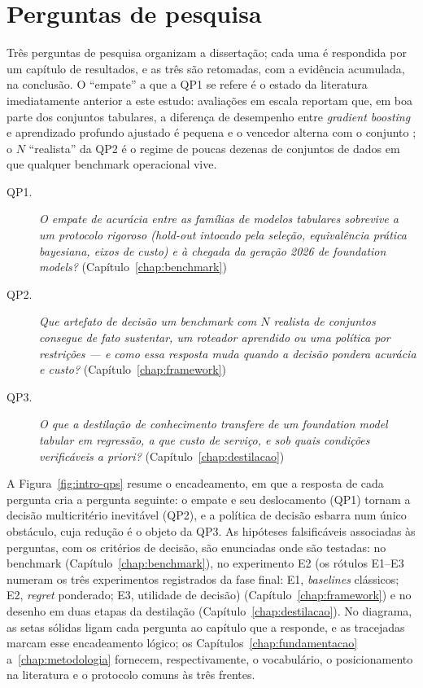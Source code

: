 \section{Perguntas de pesquisa}
\label{sec:intro-qps}

Três perguntas de pesquisa organizam a dissertação; cada uma é respondida
por um capítulo de resultados, e as três são retomadas, com a evidência
acumulada, na conclusão. O ``empate'' a que a QP1 se refere é o estado
da literatura imediatamente anterior a este estudo: avaliações em
escala reportam que, em boa parte dos conjuntos tabulares, a diferença
de desempenho entre \emph{gradient boosting} e aprendizado profundo
ajustado é pequena e o vencedor alterna com o conjunto
\citep{mcelfresh2023}; o $N$ ``realista'' da QP2 é o regime de
poucas dezenas de conjuntos de dados em que qualquer benchmark
operacional vive.

\begin{description}
  \item[QP1.] \emph{O empate de acurácia entre as famílias de modelos
    tabulares sobrevive a um protocolo rigoroso (\emph{hold-out}
    intocado pela seleção,
    equivalência prática bayesiana, eixos de custo) e à chegada da
    geração 2026 de foundation models?}
    (Capítulo~\ref{chap:benchmark})
  \item[QP2.] \emph{Que artefato de decisão um benchmark com $N$ realista
    de conjuntos consegue de fato sustentar, um roteador
    aprendido ou uma política por restrições --- e como essa resposta
    muda quando a decisão pondera acurácia e custo?}
    (Capítulo~\ref{chap:framework})
  \item[QP3.] \emph{O que a destilação de conhecimento transfere de um
    foundation model tabular em regressão, a que custo de serviço, e sob
    quais condições verificáveis a priori?}
    (Capítulo~\ref{chap:destilacao})
\end{description}

A Figura~\ref{fig:intro-qps} resume o encadeamento, em que a resposta
de cada
pergunta cria a pergunta seguinte: o empate e seu deslocamento (QP1)
tornam a
decisão multicritério inevitável (QP2), e a política de decisão
esbarra num único obstáculo, cuja redução é o objeto da QP3. As
hipóteses falsificáveis associadas às perguntas, com os critérios de
decisão, são enunciadas onde são testadas: no benchmark
(Capítulo~\ref{chap:benchmark}), no experimento E2 (os rótulos
E1--E3 numeram os três experimentos registrados da fase final: E1,
\emph{baselines} clássicos; E2, \emph{regret} ponderado; E3,
utilidade de decisão)
(Capítulo~\ref{chap:framework}) e no desenho em duas etapas da
destilação (Capítulo~\ref{chap:destilacao}). No diagrama,
as setas sólidas ligam cada pergunta ao capítulo que a responde, e as
tracejadas marcam esse encadeamento lógico; os
Capítulos~\ref{chap:fundamentacao} a~\ref{chap:metodologia} fornecem,
respectivamente, o vocabulário, o posicionamento na literatura e o
protocolo comuns às três frentes.

